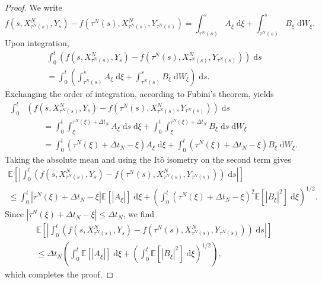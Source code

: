 \documentclass[reqno,12pt]{amsart}
\theoremstyle{plain}%
\theoremstyle{definition}
\begin{document}
\begin{proof}
    We write
    \[
        f(s, X_{\tau^N(s)}^N, Y_s) - f(\tau^N(s), X_{\tau^N(s)}^N, Y_{\tau^N(s)}) = \int_{\tau^N(s)}^s A_\xi \;\mathrm{d}\xi + \int_{\tau^N(s)}^s B_\xi \;\mathrm{d}W_\xi.
    \]
    Upon integration,
    \begin{multline*}
        \int_0^t \left(f(s, X_{\tau^N(s)}^N, Y_s) - f(\tau^N(s), X_{\tau^N(s)}^N, Y_{\tau^N(s)})\right)\;\mathrm{d}s  \\
        = \int_0^t \left(\int_{\tau^N(s)}^s A_\xi \;\mathrm{d}\xi + \int_{\tau^N(s)}^s B_\xi \;\mathrm{d}W_\xi\right)\;\mathrm{d}s.
    \end{multline*}
    Exchanging the order of integration, according to Fubini's theorem, yields
    \begin{align*}
        \int_0^t & \left(f(s, X_{\tau^N(s)}^N, Y_s) - f(\tau^N(s), X_{\tau^N(s)}^N, Y_{\tau^N(s)})\right)\;\mathrm{d}s \\
        & \qquad = \int_0^t \int_\xi^{\tau^N(\xi)+\Delta t_N} A_\xi \;\mathrm{d}s\;\mathrm{d}\xi + \int_0^t \int_\xi^{\tau^N(\xi) + \Delta t_N} B_\xi \;\mathrm{d}s\;\mathrm{d}W_\xi \\
        & \qquad = \int_0^t (\tau^N(\xi)+\Delta t_N - \xi) A_\xi \;\mathrm{d}\xi + \int_0^t (\tau^N(\xi) + \Delta t_N - \xi) B_\xi \;\mathrm{d}W_\xi.
    \end{align*}
    Taking the absolute mean and using the It\^o isometry on the second term gives
    \begin{multline*}
        \mathbb{E}\left[\left|\int_0^t \left(f(s, X_{\tau^N(s)}^N, Y_s) - f(\tau^N(s), X_{\tau^N(s)}^N, Y_{\tau^N(s)})\right)\;\mathrm{d}s\right|\right]  \\
        \leq \int_0^t |\tau^N(\xi)+\Delta t_N - \xi| \mathbb{E}[|A_\xi|] \;\mathrm{d}\xi + \left(\int_0^t (\tau^N(\xi) + \Delta t_N - \xi)^2 \mathbb{E}[|B_\xi|^2] \;\mathrm{d}\xi \right)^{1/2}.
    \end{multline*}
    Since $|\tau^N(\xi)+\Delta t_N - \xi| \leq \Delta t_N$, we find
    \begin{multline*}
        \mathbb{E}\left[\left|\int_0^t \left(f(s, X_{\tau^N(s)}^N, Y_s) - f(\tau^N(s), X_{\tau^N(s)}^N, Y_{\tau^N(s)})\right)\;\mathrm{d}s\right|\right]  \\
        \leq \Delta t_N \left(\int_0^t \mathbb{E}[|A_\xi|] \;\mathrm{d}\xi + \left(\int_0^t \mathbb{E}[|B_\xi|^2] \;\mathrm{d}\xi \right)^{1/2}\right),
    \end{multline*}
    which completes the proof.
\end{proof}
\end{document}
